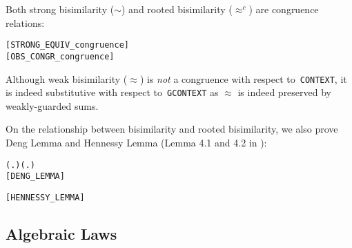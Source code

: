 Both strong bisimilarity ($\sim$) and
rooted bisimilarity ($\approx^c$) are  congruence relations:
\begin{alltt}
\HOLTokenTurnstile{}  \hfill{[STRONG_EQUIV_congruence]}
\HOLTokenTurnstile{}  \hfill{[OBS_CONGR_congruence]}
\end{alltt}

Although weak bisimilarity ($\approx$) is \emph{not} a congruence
  with respect to~\texttt{CONTEXT}, it is indeed substitutive
  with respect to~\texttt{GCONTEXT} 
as $\approx$ is indeed preserved by 
  weakly-guarded sums.

On the relationship between bisimilarity and rooted bisimilarity, 
we also prove 
Deng
Lemma and Hennessy Lemma
 (Lemma 4.1 and 4.2 in
\cite{Gorrieri:2015jt}):
\begin{alltt}
\HOLTokenTurnstile{}  \HOLSymConst{\HOLTokenWeakEQ}  \HOLSymConst{\HOLTokenImp{}}
   (\HOLSymConst{\HOLTokenExists{}}.  \HOLTokenTransBegin\HOLSymConst{\ensuremath{\tau}}\HOLTokenTransEnd {} \HOLSymConst{\HOLTokenConj{}}  \HOLSymConst{\HOLTokenWeakEQ} ) \HOLSymConst{\HOLTokenDisj{}} (\HOLSymConst{\HOLTokenExists{}}.  \HOLTokenTransBegin\HOLSymConst{\ensuremath{\tau}}\HOLTokenTransEnd {} \HOLSymConst{\HOLTokenConj{}}  \HOLSymConst{\HOLTokenWeakEQ} ) \HOLSymConst{\HOLTokenDisj{}}
    \HOLSymConst{\HOLTokenObsCongr} \hfill{[DENG_LEMMA]}
  
\HOLTokenTurnstile{}  \HOLSymConst{\HOLTokenWeakEQ}  \HOLSymConst{\HOLTokenEquiv{}}  \HOLSymConst{\HOLTokenObsCongr}  \HOLSymConst{\HOLTokenDisj{}}  \HOLSymConst{\HOLTokenObsCongr} \HOLSymConst{\ensuremath{\tau}} \HOLSymConst{\HOLTokenDisj{}} \HOLSymConst{\ensuremath{\tau}} \HOLSymConst{\HOLTokenObsCongr} \hfill{[HENNESSY_LEMMA]}
\end{alltt}

\subsection{Algebraic Laws}

